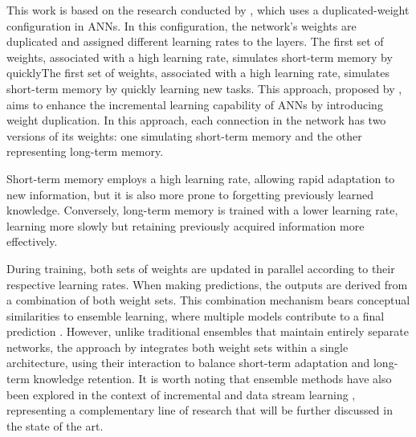 This work is based on the research conducted by \cite{bullinaria2009}, which uses a duplicated-weight configuration in ANNs. In this configuration, the network’s weights are duplicated and assigned different learning rates to the layers. The first set of weights, associated with a high learning rate, simulates short-term memory 
by quicklyThe first set of weights, associated with a high learning rate, simulates short-term memory by quickly learning new tasks. This approach, proposed by \cite{bullinaria2009}, aims to enhance the incremental learning capability of ANNs by introducing weight duplication. In this approach, each connection in the network has two versions of its weights: one simulating short-term memory and the other representing long-term memory.

Short-term memory employs a high learning rate, allowing rapid adaptation to new information, but it is also more prone to forgetting previously learned knowledge. Conversely, long-term memory is trained with a lower learning rate, learning more slowly but retaining previously acquired information more effectively.

During training, both sets of weights are updated in parallel according to their respective 
learning rates. When making predictions, the outputs are derived from a combination of both 
weight sets. This combination mechanism bears conceptual similarities to ensemble learning, 
where multiple models contribute to a final prediction \cite{krawczyk2017ensemble, 
gomes2017survey}. However, unlike traditional ensembles that maintain entirely separate 
networks, the approach by \cite{bullinaria2009} integrates both weight sets within a single 
architecture, using their interaction to balance short-term adaptation and long-term 
knowledge retention. It is worth noting that ensemble methods have also been explored in 
the context of incremental and data stream learning \cite{krawczyk2017ensemble, 
gomes2017survey}, representing a complementary line of research that will be further 
discussed in the state of the art.

